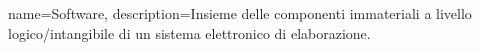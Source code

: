 {
	name={Software},
	description={Insieme delle componenti immateriali a livello logico/intangibile di un sistema elettronico di elaborazione.}
}